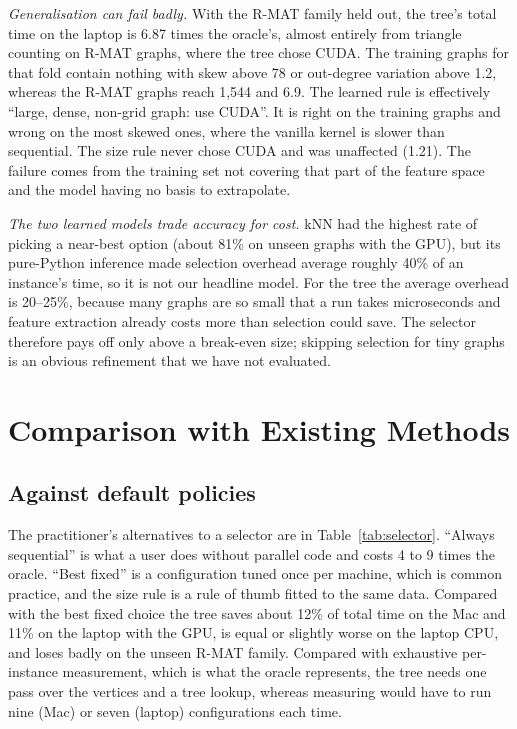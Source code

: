 \documentclass[conference]{IEEEtran}
\begin{document}
\emph{Generalisation can fail badly.} With the R-MAT family held out, the tree's total time on the laptop is 6.87 times the oracle's, almost entirely from triangle counting on R-MAT graphs, where the tree chose CUDA. The training graphs for that fold contain nothing with skew above 78 or out-degree variation above 1.2, whereas the R-MAT graphs reach 1,544 and 6.9. The learned rule is effectively ``large, dense, non-grid graph: use CUDA''. It is right on the training graphs and wrong on the most skewed ones, where the vanilla kernel is slower than sequential. The size rule never chose CUDA and was unaffected (1.21). The failure comes from the training set not covering that part of the feature space and the model having no basis to extrapolate.

\emph{The two learned models trade accuracy for cost.} kNN had the highest rate of picking a near-best option (about 81\% on unseen graphs with the GPU), but its pure-Python inference made selection overhead average roughly 40\% of an instance's time, so it is not our headline model. For the tree the average overhead is 20--25\%, because many graphs are so small that a run takes microseconds and feature extraction already costs more than selection could save. The selector therefore pays off only above a break-even size; skipping selection for tiny graphs is an obvious refinement that we have not evaluated.

\section{Comparison with Existing Methods}
\subsection{Against default policies}
The practitioner's alternatives to a selector are in Table~\ref{tab:selector}. ``Always sequential'' is what a user does without parallel code and costs 4 to 9 times the oracle. ``Best fixed'' is a configuration tuned once per machine, which is common practice, and the size rule is a rule of thumb fitted to the same data. Compared with the best fixed choice the tree saves about 12\% of total time on the Mac and 11\% on the laptop with the GPU, is equal or slightly worse on the laptop CPU, and loses badly on the unseen R-MAT family. Compared with exhaustive per-instance measurement, which is what the oracle represents, the tree needs one pass over the vertices and a tree lookup, whereas measuring would have to run nine (Mac) or seven (laptop) configurations each time.
\end{document}
